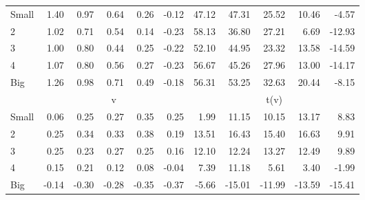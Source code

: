 \begin{table}[!ht]
\begin{tabular}{lrrrrrrrrrr}
    \\
      \cmidrule(r){2-6} \cmidrule(r){7-11}

    Small   & 1.40  & 0.97  & 0.64  & 0.26  & -0.12  & 47.12  & 47.31  & 25.52  & 10.46  & -4.57  \\
         2  & 1.02  & 0.71  & 0.54  & 0.14  & -0.23  & 58.13  & 36.80  & 27.21  & 6.69  & -12.93  \\
         3  & 1.00  & 0.80  & 0.44  & 0.25  & -0.22  & 52.10  & 44.95  & 23.32  & 13.58  & -14.59  \\
         4  & 1.07  & 0.80  & 0.56  & 0.27  & -0.23  & 56.67  & 45.26  & 27.96  & 13.00  & -14.17  \\
    Big     & 1.26  & 0.98  & 0.71  & 0.49  & -0.18  & 56.31  & 53.25  & 32.63  & 20.44  & -8.15  \\

  
    
      & \multicolumn{5}{c}{v} & \multicolumn{5}{c}{t(v)}
    
    \\
      \cmidrule(r){2-6} \cmidrule(r){7-11}

    Small   & 0.06  & 0.25  & 0.27  & 0.35  & 0.25  & 1.99  & 11.15  & 10.15  & 13.17  & 8.83  \\
         2  & 0.25  & 0.34  & 0.33  & 0.38  & 0.19  & 13.51  & 16.43  & 15.40  & 16.63  & 9.91  \\
         3  & 0.25  & 0.23  & 0.27  & 0.25  & 0.16  & 12.10  & 12.24  & 13.27  & 12.49  & 9.89  \\
         4  & 0.15  & 0.21  & 0.12  & 0.08  & -0.04  & 7.39  & 11.18  & 5.61  & 3.40  & -1.99  \\
    Big     & -0.14  & -0.30  & -0.28  & -0.35  & -0.37  & -5.66  & -15.01  & -11.99  & -13.59  & -15.41  \\

  

  \bottomrule
\end{tabular}
\label{tbl:25_Size_Inv_FF1993}
\end{table}